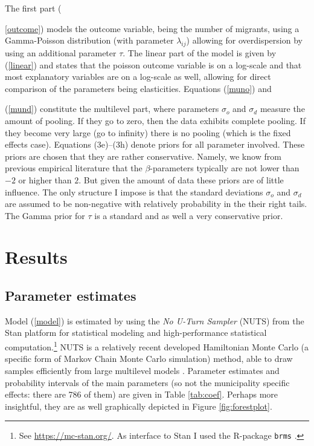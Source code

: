 \documentclass[fleqn,10pt]{SelfArx} %
\begin{document}
		  The first part ({\ref{outcome}) models the outcome variable,
          being the number of migrants, using a Gamma-Poisson distribution
          (with parameter $\lambda_{ij}$) allowing for overdispersion
          by using an additional parameter $\tau$. The linear part of
          the model is given by (\ref{linear}) and states that the
          poisson outcome variable is on a log-scale and that most explanatory
          variables are on a log-scale as well, allowing for direct
          comparison of the parameters being elasticities. Equations
          (\ref{muno}) and {(\ref{mund}) constitute the multilevel
            part, where parameters $\sigma_o$ and $\sigma_d$ measure
            the amount of pooling. If they go to zero, then the
            data exhibits complete pooling. If they become very large
            (go to infinity) there is no pooling (which is the fixed
            effects case). Equations (3e)--(3h) denote priors for all parameter involved.
            These priors are chosen that they are rather conservative. Namely, we know from previous empirical literature
            that the $\beta$-parameters typically are not lower than $-2$ or higher than $2$. But given the amount of
            data these priors are of little influence. The only structure 
            I impose is that the standard deviations $\sigma_o$ and $\sigma_d$ are assumed to be non-negative with 
            relatively probability in the their right tails. The Gamma prior for $\tau$ is a standard and as well a very conservative prior.
                      
        \section{Results}

        \subsection{Parameter estimates}
        
        Model (\ref{model}) is estimated by using the \emph{No U-Turn
          Sampler} (NUTS) from the Stan platform for statistical modeling and high-performance statistical computation.\footnote{See \href{https://mc-stan.org/}{https://mc-stan.org/}. As interface to Stan
          \citep[see for an overview article of
          Stan][]{carpenter2017stan} I used the R-package  \texttt{brms} \citep{brms}.} NUTS is a relatively recent developed Hamiltonian Monte Carlo (a specific form of Markov
        Chain Monte Carlo simulation) method, able to draw samples
        efficiently from large multilevel models
        \citep{hoffman2014no}. Parameter estimates and probability
        intervals of the main parameters (so not the municipality specific
        effects: there are 786 of them) are given in Table
        \ref{tab:coef}. Perhaps more insightful, they are as well graphically
        depicted in Figure \ref{fig:forestplot}.

}}
\end{document}

